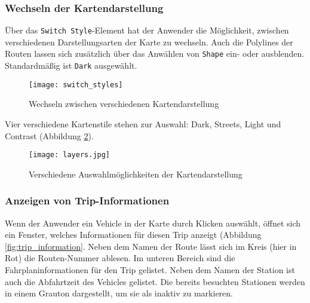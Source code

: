 
  \subsubsection*{Wechseln der Kartendarstellung}
  \label{ssub:style_auswahl}
    Über das \texttt{Switch Style}-Element {\Large {}} hat der Anwender die Möglichkeit, zwischen verschiedenen Darstellungsarten der Karte zu wechseln. Auch die Polylines der Routen lassen sich zusätzlich über das Anwählen von \texttt{Shape} ein- oder ausblenden. Standardmäßig ist \texttt{Dark} ausgewählt.

    \begin{figure}[htbp]
      \begin{center}
        \texttt{[image: switch\_styles]}
        \caption{Wechseln zwischen verschiedenen Kartendarstellung}
        \label{fig:switch_styles}
      \end{center}
    \end{figure}

    Vier verschiedene Kartenstile stehen zur Auswahl: Dark, Streets, Light und Contrast (Abbildung \ref{fig:layers}).

    \begin{figure}[htbp]
      \begin{center}
        \texttt{[image: layers.jpg]}
        \caption{Verschiedene Auswahlmöglichkeiten der Kartendarstellung}
        \label{fig:layers}
      \end{center}
    \end{figure}
    

  \subsubsection*{Anzeigen von Trip-Informationen}
  \label{ssub:anzeigen_von_trip_informationen}
    Wenn der Anwender ein Vehicle in der Karte durch Klicken auswählt, öffnet sich ein Fenster, welches Informationen für diesen Trip anzeigt (Abbildung \ref{fig:trip_information}. Neben dem Namen der Route lässt sich im Kreis (hier in Rot) die Routen-Nummer ablesen. Im unteren Bereich sind die Fahrplaninformationen für den Trip gelistet. Neben dem Namen der Station ist auch die Abfahrtzeit des Vehicles gelistet. Die bereits besuchten Stationen werden in einem Grauton dargestellt, um sie als inaktiv zu markieren.


